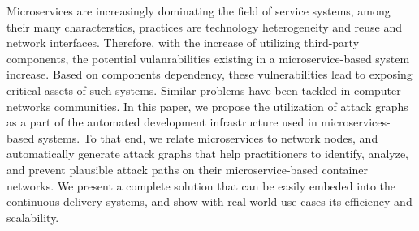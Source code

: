 
Microservices are increasingly dominating the field of service systems, among their many characterstics, practices are technology heterogeneity and reuse and network interfaces. Therefore, with the increase of utilizing third-party components, the potential vulanrabilities existing in a microservice-based system increase. Based on components dependency, these vulnerabilities lead to exposing critical assets of such systems. Similar problems have been tackled in computer networks communities. In this paper, we propose the utilization of attack graphs as a part of the automated development infrastructure used in microservices-based systems. To that end, we relate microservices to network nodes, and automatically generate attack graphs that help practitioners to identify, analyze, and prevent plausible attack paths on their microservice-based container networks. We present a complete solution that can be easily embeded into the continuous delivery systems, and show with real-world use cases its efficiency and scalability. 
